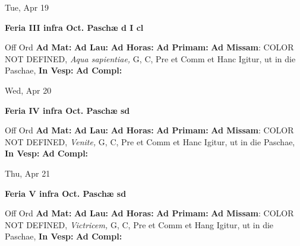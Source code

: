 \documentclass[10pt]{memoir}
\begin{document}
\begin{center}
\begin{minipage}{3.5in}
\vspace{2em}
\begin{center}Tue, Apr 19
\end{center}
\textbf{ \large Feria III infra Oct. Paschæ
\textnormal{\normalsize d I cl}}

\begin{justify}Off Ord
\textbf{Ad Mat: }
\textbf{Ad Lau: }
\textbf{Ad Horas: }
\textbf{Ad Primam: }\textbf{Ad Missam}: COLOR NOT DEFINED, \textit{Aqua sapientiae,} G, C, Pre et Comm et Hanc Igitur, ut in die Paschae, 
\textbf{In Vesp: }
\textbf{Ad Compl: }
\end{justify}
\end{minipage}
\end{center}

\begin{center}
\begin{minipage}{3.5in}
\vspace{2em}
\begin{center}Wed, Apr 20
\end{center}
\textbf{ \large Feria IV infra Oct. Paschæ
\textnormal{\normalsize sd}}

\begin{justify}Off Ord
\textbf{Ad Mat: }
\textbf{Ad Lau: }
\textbf{Ad Horas: }
\textbf{Ad Primam: }\textbf{Ad Missam}: COLOR NOT DEFINED, \textit{Venite,} G, C, Pre et Comm et Hanc Igitur, ut in die Paschae, 
\textbf{In Vesp: }
\textbf{Ad Compl: }
\end{justify}
\end{minipage}
\end{center}

\begin{center}
\begin{minipage}{3.5in}
\vspace{2em}
\begin{center}Thu, Apr 21
\end{center}
\textbf{ \large Feria V infra Oct. Paschæ
\textnormal{\normalsize sd}}

\begin{justify}Off Ord
\textbf{Ad Mat: }
\textbf{Ad Lau: }
\textbf{Ad Horas: }
\textbf{Ad Primam: }\textbf{Ad Missam}: COLOR NOT DEFINED, \textit{Victricem,} G, C, Pre et Comm et Hang Igitur, ut in die Paschae, 
\textbf{In Vesp: }
\textbf{Ad Compl: }
\end{justify}
\end{minipage}
\end{center}
\end{document}
